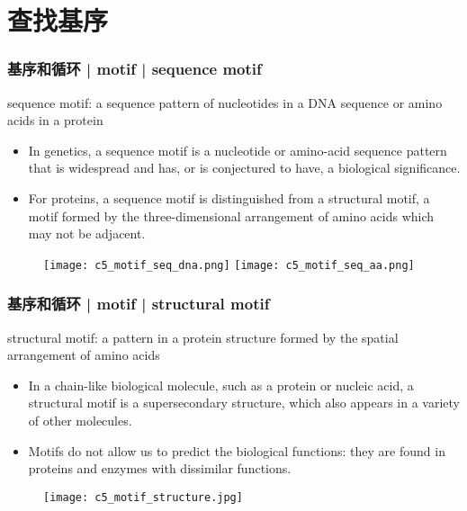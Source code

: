 \section{查找基序}
\begin{frame}
  \frametitle{基序和循环 | motif | sequence motif}
  \begin{block}{sequence motif: a sequence pattern of nucleotides in a DNA sequence or amino acids in a protein}
    \begin{itemize}
      \item In genetics, a sequence motif is a nucleotide or amino-acid sequence pattern that is widespread and has, or is conjectured to have, a biological significance.
      \item For proteins, a sequence motif is distinguished from a structural motif, a motif formed by the three-dimensional arrangement of amino acids which may not be adjacent.
    \end{itemize}
  \end{block}
  \vspace{-0.5em}
  \begin{figure}
    \centering
    \texttt{[image: c5\_motif\_seq\_dna.png]}
    \texttt{[image: c5\_motif\_seq\_aa.png]}
  \end{figure}
\end{frame}

\begin{frame}
  \frametitle{基序和循环 | motif | structural motif}
  \begin{block}{structural motif: a pattern in a protein structure formed by the spatial arrangement of amino acids}
    \begin{itemize}
      \item In a chain-like biological molecule, such as a protein or nucleic acid, a structural motif is a supersecondary structure, which also appears in a variety of other molecules.
      \item Motifs do not allow us to predict the biological functions: they are found in proteins and enzymes with dissimilar functions.
    \end{itemize}
  \end{block}
  \vspace{-0.5em}
  \begin{figure}
    \centering
    \texttt{[image: c5\_motif\_structure.jpg]}
  \end{figure}
\end{frame}


